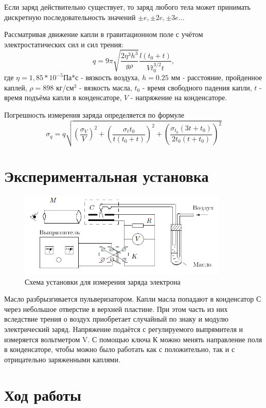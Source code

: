 \documentclass[a4paper]{article}
\begin{document}
Если заряд действительно существует, то заряд любого тела может принимать дискретную последовательность значений $\pm e, \pm 2e, \pm 3e ...$ \par
Рассматривая движение капли в гравитационном поле с учётом электростатических сил и сил трения:
\begin{equation}
    q= 9 \pi \sqrt{\frac{2\eta^3 h^3}{g\rho}}\frac{l(t_0 + t)}{V t_0^{3/2}t},
\end{equation}
где $\eta = 1,85*10^{-5}$Па*с - вязкость воздуха, $h = 0.25$ мм - расстояние, пройденное каплей, $\rho = 898$ кг/см$^3$ - вязкость масла, $t_0$ - время свободного падения капли, $t$ - время подъёма капли в конденсаторе, $V$ - напряжение на конденсаторе. \par
Погрешность измерения заряда определяется по формуле 
\begin{equation}
    \sigma_q = q\sqrt{(\frac{\sigma_V}{V})^2 + (\frac{\sigma_t t_0}{t(t_0 + t)})^2 + (\frac{\sigma_t_0(3t + t_0)}{2t_0(t+t_0)})^2}
\end{equation}

\section{Экспериментальная установка}

\begin{figure}[h]
    \centering
    \includegraphics[width=10cm]{fig1.PNG}
    \caption{Схема установки для измерения заряда электрона}
    \label{fig:vac}
\end{figure}

Масло разбрызгивается пульверизатором. Капли масла попадают в конденсатор С через небольшое отверстие в верхней пластине. При этом часть из них вследствие трения о воздух приобретает случайный по знаку и модулю электрический заряд. Напряжение подаётся с регулируемого выпрямителя и измеряется вольтметром V. С помощью ключа К можно менять направление поля в конденсаторе, чтобы можно было работать как с положительно, так и с отрицательно заряженными каплями.

\section{Ход работы}
\end{document}
